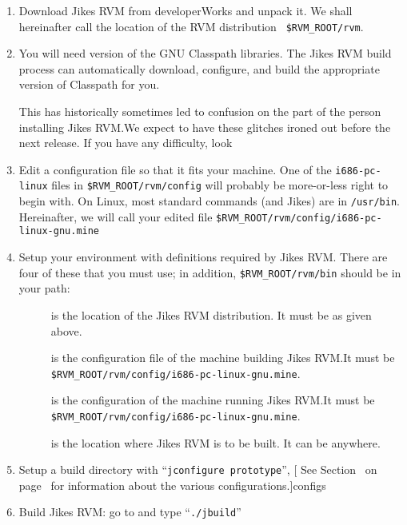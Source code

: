 \begin{enumerate}
\item Download Jikes RVM from developerWorks and unpack it.  We shall
hereinafter call the location of the RVM distribution {\tt
  \$RVM\_\-ROOT\-/\-rvm}. 


%
%
\item You will need version \classpathversion{} of the GNU Classpath
libraries.  The Jikes RVM build process can automatically download, 
configure, and build the appropriate version of Classpath for you.

This has historically sometimes led to confusion on the part of the
person installing Jikes RVM.\@  We expect to have these glitches ironed
out before the next release.  If you have any difficulty, look \AtManualClasspathRootDiscussion{}

\item Edit a configuration file so that it fits your machine.  One of
the {\tt i686-pc-linux} files in {\tt \$RVM\_\-ROOT/rvm/config} will probably be
more-or-less right to begin with.  On Linux, most standard commands
(and Jikes) are in {\tt /usr/bin}.  Hereinafter, we will call your edited
file {\tt \$RVM\_\-ROOT/rvm/config/i686-pc-linux-gnu.mine}

%
\item Setup your environment with definitions required by Jikes RVM.\@
There are four of these that you must use; in addition,
{\tt \$RVM\_\-ROOT/rvm/bin} should be in your path:

\begin{description}

\item[] is the location of the Jikes RVM distribution.  It
must be  as given above.

\item[] is the configuration file of the machine
building Jikes RVM.\@  It must be
{\tt \$RVM\_\-ROOT/rvm/config/i686-pc-linux-gnu.mine}.

\item[] is the configuration of the
  machine running Jikes RVM.\@  It must be {\tt \$RVM\_\-ROOT/rvm/config/i686-pc-linux-gnu.mine}.

\item[] is the location where Jikes RVM is to be built.  It
can be anywhere.

\end{description}

\item Setup a build directory with ``{\tt jconfigure prototype}'', [  See Section~\Ref{} on page~\Pageref{}
for information about the various configurations.]{configs}

\item Build Jikes RVM: go to  and type ``{\tt ./jbuild}''

\end{enumerate}

